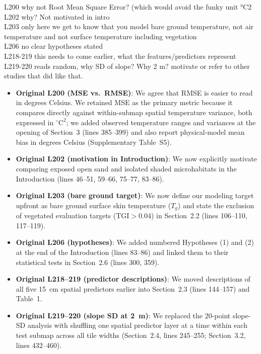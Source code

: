 \documentclass[12pt,english]{reviewresponse}
\begin{document}
\begin{revcomment}
L200 why not Root Mean Square Error? (which would avoid the funky unit °C2\\
L202 why? Not motivated in intro\\
L203 only here we get to know that you model bare ground temperature, not air temperature and not surface temperature including vegetation\\
L206 no clear hypotheses stated\\
L218-219 this needs to come earlier, what the features/predictors represent\\
L219-220 reads random, why SD of slope? Why 2 m? motivate or refer to other studies that did like that.
\end{revcomment}

\begin{revresponse}
\begin{itemize}[leftmargin=*, itemsep=0.2em]
    \item \textbf{Original L200 (MSE vs.\ RMSE)}: We agree that RMSE is easier to read in degrees Celsius. We retained MSE as the primary metric because it compares directly against within-submap spatial temperature variance, both expressed in $^{\circ}\mathrm{C}^2$; we added observed temperature ranges and variances at the opening of Section~3 (lines 385--399) and also report physical-model mean bias in degrees Celsius (Supplementary Table~S5).
    \item \textbf{Original L202 (motivation in Introduction)}: We now explicitly motivate comparing exposed open sand and isolated shaded microhabitats in the Introduction (lines 46--51, 59--66, 75--77, 83--86).
    \item \textbf{Original L203 (bare ground target)}: We now define our modeling target upfront as bare ground surface skin temperature ($T_g$) and state the exclusion of vegetated evaluation targets ($\text{TGI} > 0.04$) in Section~2.2 (lines 106--110, 117--119).
    \item \textbf{Original L206 (hypotheses)}: We added numbered Hypotheses (1) and (2) at the end of the Introduction (lines 83--86) and linked them to their statistical tests in Section~2.6 (lines 300, 359).
    \item \textbf{Original L218--219 (predictor descriptions)}: We moved descriptions of all five 15~cm spatial predictors earlier into Section~2.3 (lines 144--157) and Table~1.
    \item \textbf{Original L219--220 (slope SD at 2~m)}: We replaced the 20-point slope-SD analysis with shuffling one spatial predictor layer at a time within each test submap across all tile widths (Section~2.4, lines 245--255; Section~3.2, lines 432--460).
\end{itemize}
\end{revresponse}
\end{document}
